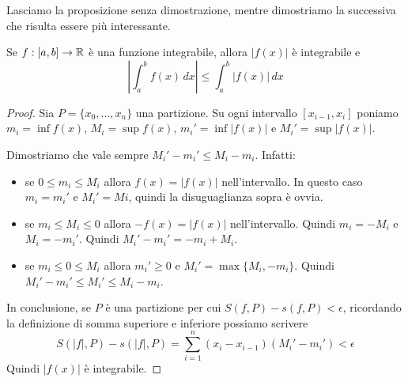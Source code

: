 Lasciamo la proposizione senza dimostrazione, mentre dimostriamo la successiva che risulta essere più interessante.

\begin{proposition}
Se $f: [a,b] \to \mathbb R$ è una funzione integrabile, allora $|f(x)|$ è integrabile e
\begin{equation*}
\left\lvert \int_a^b f(x) \, dx \right\rvert \le \int_a^b |f(x)| \, dx
\end{equation*}
\end{proposition}

\begin{proof}
Sia $P = \{x_0, \ldots, x_n\}$ una partizione. Su ogni intervallo $[x_{i-1}, x_i]$ poniamo $m_i = \inf f(x)$, $M_i = \sup f(x)$, $m_i' = \inf |f(x)|$ e $M_i' = \sup |f(x)|$.

Dimostriamo che vale sempre $M_i' - m_i' \le M_i - m_i$. Infatti:
\begin{itemize}
\item se $0 \le m_i \le M_i$ allora $f(x) = |f(x)|$ nell'intervallo. In questo caso $m_i = m_i'$ e $M_i' = Mi$, quindi la disuguaglianza sopra è ovvia.
\item se $m_i \le M_i \le 0$ allora $-f(x) = |f(x)|$ nell'intervallo. Quindi $m_i = -M_i$ e $M_i = -m_i'$. Quindi $M_i' - m_i' = -m_i + M_i$.
\item se $m_i \le 0 \le M_i$ allora $m_i' \ge 0$ e $M_i' = \max\{M_i, -m_i\}$. Quindi $M_i' - m_i' \le M_i' \le M_i - m_i$.
\end{itemize}

In conclusione, se $P$ è una partizione per cui $S(f,P)-s(f,P) < \epsilon$, ricordando la definizione di somma superiore e inferiore possiamo scrivere
\begin{equation*}
S(|f|,P)-s(|f|,P) = \sum_{i=1}^n (x_i - x_{i-1}) (M_i' - m_i') < \epsilon
\end{equation*}
Quindi $|f(x)|$ è integrabile.
\end{proof}

